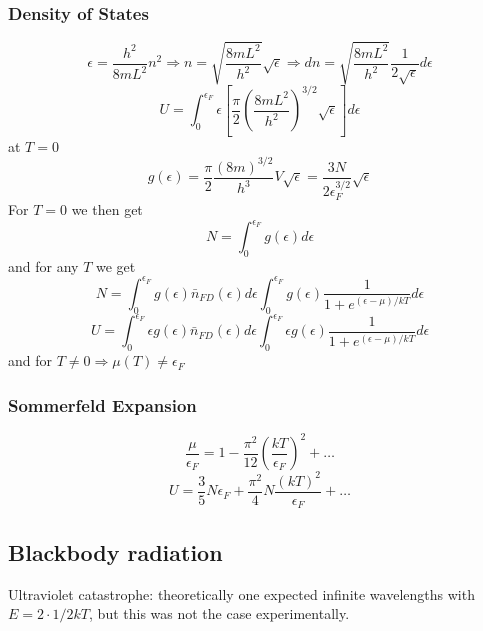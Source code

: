 \documentclass[a4paper,norsk, 10pt]{article}
\begin{document}
\subsubsection{Density of States}
\begin{equation}
\epsilon = \frac{h^2}{8mL^2}n^2 \Rightarrow n = \sqrt{\frac{8mL^2}{h^2}}\sqrt{\epsilon} \Rightarrow dn = \sqrt{\frac{8mL^2}{h^2}} \frac{1}{2\sqrt{\epsilon}}d\epsilon
\end{equation}
\begin{equation}
U = \int_0^{\epsilon_F}\epsilon\left[\frac{\pi}{2}\left(\frac{8mL^2}{h^2}\right)^{3/2}\sqrt{\epsilon}\right] d\epsilon
\end{equation}
at $T=0$
\begin{equation}
g(\epsilon) = \frac{\pi}{2}\frac{(8m)^{3/2}}{h^3}V\sqrt{\epsilon} = \frac{3N}{2\epsilon_F^{3/2}}\sqrt{\epsilon}
\end{equation}
For $T=0$ we then get
\begin{equation}
N = \int_0^{\epsilon_F}g(\epsilon) d\epsilon
\end{equation}
and for any $T$ we get
\begin{equation}
N = \int_0^{\epsilon_F}g(\epsilon) \bar{n}_{FD}(\epsilon) d\epsilon \int_0^{\epsilon_F}g(\epsilon)\frac{1}{1 + e^{(\epsilon - \mu)/kT}} d\epsilon
\end{equation}
\begin{equation}
U = \int_0^{\epsilon_F}\epsilon g(\epsilon) \bar{n}_{FD}(\epsilon) d\epsilon \int_0^{\epsilon_F}\epsilon g(\epsilon)\frac{1}{1 + e^{(\epsilon - \mu)/kT}} d\epsilon
\end{equation}
and for $T\neq 0 \Rightarrow \mu(T) \neq \epsilon_F$
\subsubsection{Sommerfeld Expansion}
\begin{equation}
\frac{\mu }{\epsilon_F} = 1 - \frac{\pi^2}{12}\left(\frac{kT}{\epsilon_F}\right)^2 + \ldots
\end{equation}
\begin{equation}
U = \frac{3}{5}N\epsilon_F + \frac{\pi^2}{4}N\frac{(kT)^2}{\epsilon_F} + \ldots
\end{equation}
\subsection{Blackbody radiation}
Ultraviolet catastrophe: theoretically one expected infinite wavelengths with $E = 2\cdot 1/2 kT$, but this was not the case experimentally.
\end{document}
